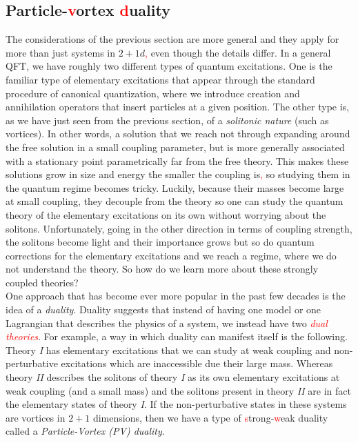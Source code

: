     \subsection{Particle-\textcolor{red}{v}ortex \textcolor{red}{d}uality}
    The considerations of the previous section are more general and they apply for more than just systems in $2+1d$\textcolor{red}{,} even though the details differ. In a general QFT, we have roughly two different types of quantum excitations. One is the familiar type of elementary excitations that appear through the standard procedure of canonical quantization, where we introduce creation and annihilation operators that insert particles at a given position. The other type is, as we have just seen from the previous section, of a \textit{solitonic nature} (such as vortices). In other words, a solution that we reach not through expanding around the free solution in a small coupling parameter, but is more generally associated with a stationary point parametrically far from the free theory. This makes these solutions grow in size and energy the smaller the coupling is\textcolor{red}{,} so studying them in the quantum regime becomes tricky. Luckily, because their masses become large at small coupling, they decouple from the theory so one can study the quantum theory of the elementary excitations on its own without worrying about the solitons. Unfortunately, going in the other direction in terms of coupling strength, the solitons become light and their importance grows but so do quantum corrections for the elementary excitations and we reach a regime, where we do not understand the theory. So how do we learn more about these strongly coupled theories? \\
    \indent One approach that has become ever more popular in the past few decades is the idea of a \textit{duality}. Duality suggests that instead of having one model or one Lagrangian that describes the physics of a system, we instead have two \textcolor{red}{\textit{dual theories}}. For example, a way in which duality can manifest itself is the following. Theory \textit{I} has elementary excitations that we can study at weak coupling and non-perturbative excitations which are inaccessible due their large mass. Whereas theory \textit{II} describes the solitons of theory \textit{I} as its own elementary excitations at weak coupling (and a small mass) and the solitons present in theory \textit{II} are in fact the elementary states of theory \textit{I}. If the non-perturbative states in these systems are vortices in $2+1$ dimensions, then we have a type of \textcolor{red}{s}trong-\textcolor{red}{w}eak duality called a \textit{Particle-Vortex (PV) duality}. \\
